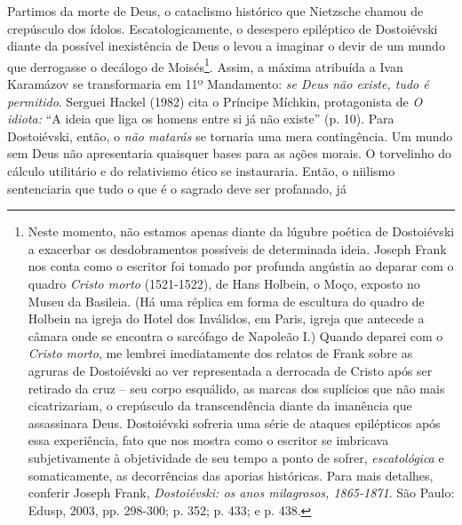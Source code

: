 Partimos da morte de Deus, o cataclismo histórico que Nietzsche chamou
de crepúsculo dos ídolos. Escatologicamente, o desespero epiléptico de
Dostoiévski diante da possível inexistência de Deus o levou a imaginar o
devir de um mundo que derrogasse o decálogo de Moisés\footnote{Neste
  momento, não estamos apenas diante da lúgubre poética de Dostoiévski a
  exacerbar os desdobramentos possíveis de determinada ideia. Joseph
  Frank nos conta como o escritor foi tomado por profunda angústia ao
  deparar com o quadro \emph{Cristo morto} (1521-1522), de Hans Holbein,
  o Moço, exposto no Museu da Basileia. (Há uma réplica em forma de
  escultura do quadro de Holbein na igreja do Hotel dos Inválidos, em
  Paris, igreja que antecede a câmara onde se encontra o sarcófago de
  Napoleão I.) Quando deparei com o \emph{Cristo morto}, me lembrei
  imediatamente dos relatos de Frank sobre as agruras de Dostoiévski ao
  ver representada a derrocada de Cristo após ser retirado da cruz --
  seu corpo esquálido, as marcas dos suplícios que não mais
  cicatrizariam, o crepúsculo da transcendência diante da imanência que
  assassinara Deus. Dostoiévski sofreria uma série de ataques
  epilépticos após essa experiência, fato que nos mostra como o escritor
  se imbricava subjetivamente à objetividade de seu tempo a ponto de
  sofrer, \emph{escatológica} e somaticamente, as decorrências das
  aporias históricas. Para mais detalhes, conferir Joseph Frank,
  \emph{Dostoiévski: os anos milagrosos, 1865-1871}. São Paulo: Edusp,
  2003, pp. 298-300; p. 352; p. 433; e p. 438.}. Assim, a máxima
atribuída a Ivan Karamázov se transformaria em 11º Mandamento: \emph{se
Deus não existe, tudo é permitido}. Serguei Hackel (1982) cita o
Príncipe Míchkin, protagonista de \emph{O idiota:} ``A ideia que liga os
homens entre si já não existe'' (p. 10). Para Dostoiévski, então, o
\emph{não matarás} se tornaria uma mera contingência. Um mundo sem Deus
não apresentaria quaisquer bases para as ações morais. O torvelinho do
cálculo utilitário e do relativismo ético se instauraria. Então, o
niilismo sentenciaria que tudo o que é o sagrado deve ser profanado, já
